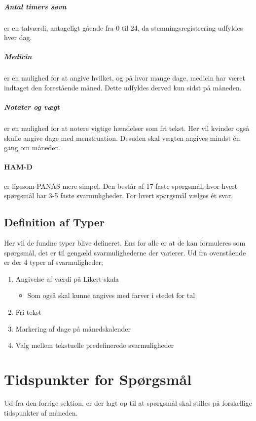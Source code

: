 \subparagraph{Antal timers søvn} er en talværdi, antageligt gående fra 0 til 24, da stemningsregistrering udfyldes hver dag.

\subparagraph{Medicin} er en mulighed for at angive hvilket, og på hvor mange dage, medicin har været indtaget den forestående måned.
Dette udfyldes derved kun sidst på måneden.

\subparagraph{Notater og vægt} er en mulighed for at notere vigtige hændelser som fri tekst.
Her vil kvinder også skulle angive dage med menstruation.
Desuden skal vægten angives mindst én gang om måneden.

\paragraph{HAM-D} er ligesom PANAS mere simpel.
Den består af 17 faste spørgsmål, hvor hvert spørgsmål har 3-5 faste svarmuligheder.
For hvert spørgsmål vælges ét svar.

\subsection{Definition af Typer}
Her vil de fundne typer blive defineret.
Ens for alle er at de kan formuleres som spørgsmål, det er til gengæld svarmulighederne der varierer.
Ud fra ovenstående er der 4 typer af svarmuligheder;

\begin{enumerate}
\item Angivelse af værdi på Likert-skala 
\begin{itemize}
\item Som også skal kunne angives med farver i stedet for tal
\end{itemize}
\item Fri tekst
\item Markering af dage på månedskalender
\item Valg mellem tekstuelle predefinerede svarmuligheder
\end{enumerate}

\section{Tidspunkter for Spørgsmål}
Ud fra den forrige sektion, er der lagt op til at spørgsmål skal stilles på forskellige tidspunkter af måneden.


